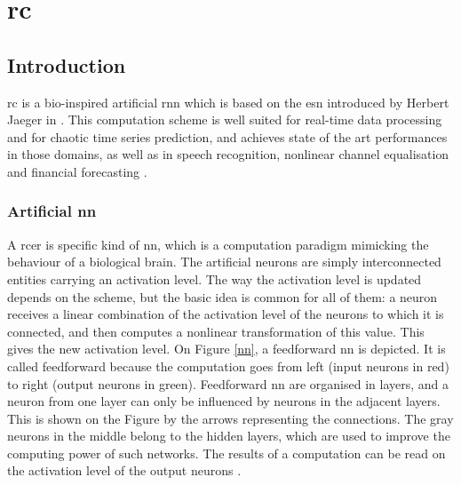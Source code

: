 \chapter{\acrlong{rc}}
\label{rc}


\section{Introduction}

\gls{rc} is a bio-inspired artificial \gls{rnn} which is based on the \gls{esn} introduced by Herbert Jaeger in \cite{Jaeger2004}. This computation scheme is well suited for real-time data processing and for chaotic time series prediction\cite{Jaeger2004, JaegerH.2001Tesa, Lukoeviius2012}, and achieves state of the art performances in those domains, as well as in speech recognition\cite{Verstraeten2006, NIPS2010_4056, Jaeger2007}, nonlinear channel equalisation\cite{Jaeger2004} and financial forecasting \cite{financialTimeSeries}.\\


\subsection{Artificial \acrlong{nn}}

A \gls{rcer} is specific kind of \gls{nn}, which is a computation paradigm mimicking the behaviour of a biological brain. The artificial neurons are simply interconnected entities carrying an activation level. The way the activation level is updated depends on the scheme, but the basic idea is common for all of them: a neuron receives a linear combination of the activation level of the neurons to which it is connected, and then computes a nonlinear transformation of this value. This gives the new activation level. On Figure \ref{nn}, a feedforward \gls{nn} is depicted. It is called feedforward because the computation goes from left (input neurons in red) to right (output neurons in green). Feedforward \gls{nn} are organised in layers, and a neuron from one layer can only be influenced by neurons in the adjacent layers. This is shown on the Figure by the arrows representing the connections. The gray neurons in the middle belong to the hidden layers, which are used to improve the computing power of such networks. The results of a computation can be read on the activation level of the output neurons \cite[p.727]{russell2010artificial}\cite[p.225]{bishop2006pattern}.


